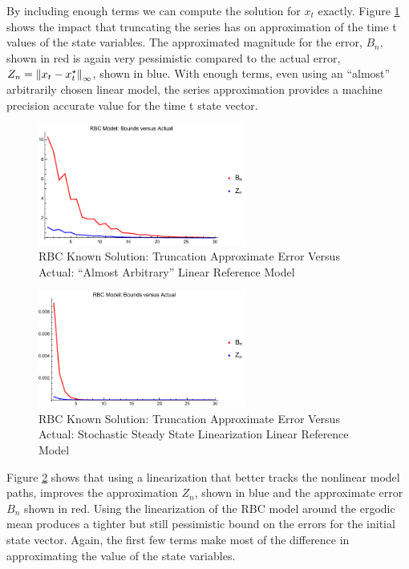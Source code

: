 \documentclass[12pt]{article}
\begin{document}
By including enough terms we can compute the solution for $x_t$ 
exactly.
Figure \ref{rbcTrunc} shows the impact that truncating the series has 
on approximation of the time t values of the state variables.   The approximated magnitude for the error, $B_n$, shown in red 
 is again very pessimistic compared to the actual error, $Z_n=\left\lVert x_t-x_t^\star\right\rVert_\infty$, shown in blue.
With enough terms, even using an ``almost'' arbitrarily chosen linear model,  the series approximation provides a machine precision accurate value for the time t state vector. 

\begin{figure}
  \centering
\includegraphics[width=2.7in]{simpArbBoundsVActual.pdf}  
  \caption{RBC Known Solution: Truncation Approximate Error  Versus Actual: ``Almost Arbitrary'' Linear Reference Model}
  \label{rbcTrunc}
\end{figure}
\begin{figure}
  \centering
\includegraphics[width=2.7in]{simpBoundsVActual.pdf}  
  \caption{RBC Known Solution: Truncation Approximate Error Versus Actual: Stochastic Steady State Linearization Linear Reference Model}
  \label{rbcTruncSimp}
\end{figure}



Figure \ref{rbcTruncSimp} shows that using a 
linearization that better tracks the 
nonlinear model paths, improves the approximation $Z_n$, shown in blue  and the approximate error  $B_n$ shown in red.
Using the linearization of the RBC model around the ergodic mean produces a tighter but still pessimistic bound on the errors for the initial state vector.
Again, the first few terms make most of the difference in approximating the value of the state variables.
\end{document}
